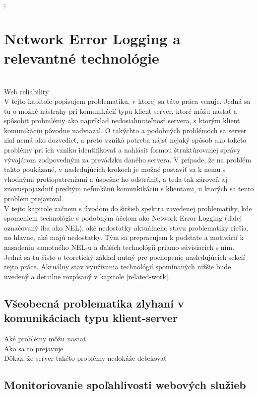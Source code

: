 ;\chapter{Network Error Logging a relevantné technológie}
\label{nel-and-related-technologies}

\\
Web reliability
\\
V tejto kapitole popisujem problematiku, v ktorej sa táto práca venuje. Jedná sa tu o možné nástrahy pri komunikácií typu klient-server,
ktoré môžu nastať a spôsobiť probmlémy ako napríklad nedosiahnuteľnosť servera, s ktorým klient komunikáciu pôvodne nadviazal.
O takýchto a podobných problémoch sa server ziaľ nemá ako dozvedieť, a preto vzniká potreba nájsť nejaký spôsob ako takéto problémy pri ich
vzniku identifikovať a nahlásiť formou štruktúrovanej správy vývojárom zodpovedným za prevádzku daného servera. V prípade, že 
na problém takto poukázané, v nasledujúcich krokoch je možné postaviť sa k nemu s vhodnými protiopatreniami a úspešne ho odstrániť, a teda 
tak zároveň aj znovuspojazdniť predtým nefunkčnú komunkikáciu s klientami, u ktorých sa tento problém prejavoval.
\\
V tejto kapitole začnem s úvodom do širšieh spektra zavedenej problematiky, kde spomeniem technológie s podobným účelom 
ako Network Error Logging (ďalej označovaný iba ako NEL), aké nedostatky aktuálneho stavu problematiky riešia, no hlavne, aké majú nedostatky. 
Tým sa prepracujem k podstate a motivácií k nasadeniu samotného NEL-u a ďalších technológií priamo súvisiacich s ním. 
Jedná sa tu čisto o teoretický základ nutný pre pochopenie nasledujúcich sekcií tejto práce. 
Aktuálny stav využívania technológií spomínaných nižšie bude uvedený a detailne rozpísaný v kapitole \ref{related-work}.

\section{Všeobecná problematika zlyhaní v komunikáciach typu klient-server}

Aké problémy môžu nastať
\\
Ako sa to prejavuje
\\
Dôkaz, že server takéto problémy nedokáže detekovať

\section{Monitoriovanie spoľahlivosti webových služieb}

